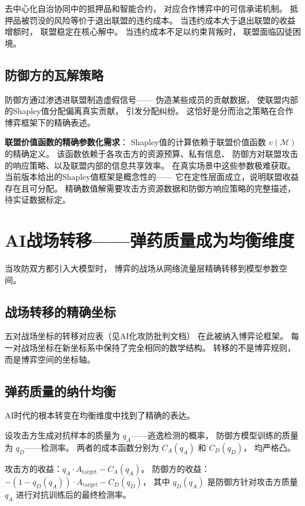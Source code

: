 \documentclass[11pt,a4paper]{article}
\begin{document}
去中心化自治协同中的抵押品和智能合约，
对应合作博弈中的可信承诺机制。
抵押品被罚没的风险等价于退出联盟的违约成本。
当违约成本大于退出联盟的收益增额时，
联盟稳定在核心解中。
当违约成本不足以约束背叛时，
联盟面临囚徒困境。

\subsection{防御方的瓦解策略}

防御方通过渗透进联盟制造虚假信号——
伪造某些成员的贡献数据，
使联盟内部的Shapley值分配偏离真实贡献，
引发分配纠纷。
这恰好是分而治之策略在合作博弈框架下的精确表述。

\textbf{联盟价值函数的精确参数化需求}：
Shapley值的计算依赖于联盟价值函数 \(v(\mathcal{M})\) 的精确定义。
该函数依赖于各攻击方的资源预算、私有信息、
防御方对联盟攻击的响应策略、以及联盟内部的信息共享效率。
在真实场景中这些参数极难获取。
当前版本给出的Shapley值框架是概念性的——
它在定性层面成立，说明联盟收益存在且可分配。
精确数值解需要攻击方资源数据和防御方响应策略的完整描述，
待实证数据标定。

\section{AI战场转移——弹药质量成为均衡维度}

当攻防双方都引入大模型时，
博弈的战场从网络流量层精确转移到模型参数空间。

\subsection{战场转移的精确坐标}

五对战场坐标的转移对应表（见AI化攻防批判文档）
在此被纳入博弈论框架。
每一对战场坐标在新坐标系中保持了完全相同的数学结构。
转移的不是博弈规则，而是博弈空间的坐标轴。

\subsection{弹药质量的纳什均衡}

AI时代的根本转变在均衡维度中找到了精确的表达。

设攻击方生成对抗样本的质量为 \(q_A\)——逃逸检测的概率，
防御方模型训练的质量为 \(q_D\)——检测率。
两者的成本函数分别为 \(C_A(q_A)\) 和 \(C_D(q_D)\)，
均严格凸。

攻击方的收益：\(q_A \cdot A_{\text{target}} - C_A(q_A)\)。
防御方的收益：\(-(1 - q_D(q_A)) \cdot A_{\text{target}} - C_D(q_D)\)，
其中 \(q_D(q_A)\) 是防御方针对攻击方质量 \(q_A\)
进行对抗训练后的最终检测率。
\end{document}
